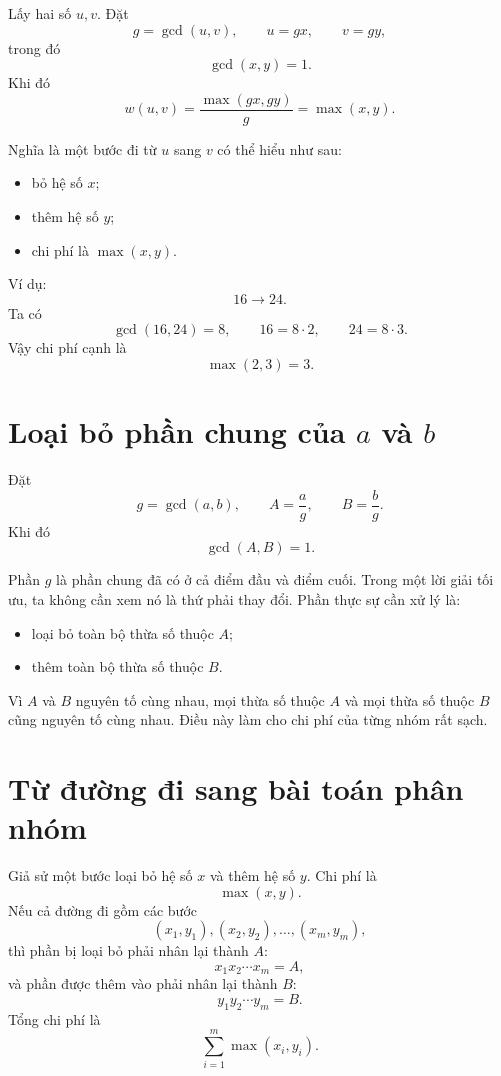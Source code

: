 \documentclass[11pt,a4paper]{article}
\begin{document}
Lấy hai số \(u,v\). Đặt
\[
  g=\gcd(u,v),\qquad u=gx,\qquad v=gy,
\]
trong đó
\[
  \gcd(x,y)=1.
\]
Khi đó
\[
  w(u,v)=\frac{\max(gx,gy)}{g}=\max(x,y).
\]

Nghĩa là một bước đi từ \(u\) sang \(v\) có thể hiểu như sau:

\begin{itemize}
  \item bỏ hệ số \(x\);
  \item thêm hệ số \(y\);
  \item chi phí là \(\max(x,y)\).
\end{itemize}

Ví dụ:
\[
16\rightarrow 24.
\]
Ta có
\[
\gcd(16,24)=8,\qquad 16=8\cdot 2,\qquad 24=8\cdot 3.
\]
Vậy chi phí cạnh là
\[
\max(2,3)=3.
\]

\section{\texorpdfstring{Loại bỏ phần chung của \(a\) và \(b\)}{Loại bỏ phần chung của a và b}}

Đặt
\[
  g=\gcd(a,b),\qquad A=\frac{a}{g},\qquad B=\frac{b}{g}.
\]
Khi đó
\[
  \gcd(A,B)=1.
\]

Phần \(g\) là phần chung đã có ở cả điểm đầu và điểm cuối. Trong một lời giải tối ưu, ta không cần xem nó là thứ phải thay đổi. Phần thực sự cần xử lý là:

\begin{itemize}
  \item loại bỏ toàn bộ thừa số thuộc \(A\);
  \item thêm toàn bộ thừa số thuộc \(B\).
\end{itemize}

Vì \(A\) và \(B\) nguyên tố cùng nhau, mọi thừa số thuộc \(A\) và mọi thừa số thuộc \(B\) cũng nguyên tố cùng nhau. Điều này làm cho chi phí của từng nhóm rất sạch.

\section{Từ đường đi sang bài toán phân nhóm}

Giả sử một bước loại bỏ hệ số \(x\) và thêm hệ số \(y\). Chi phí là
\[
  \max(x,y).
\]
Nếu cả đường đi gồm các bước
\[
  (x_1,y_1),(x_2,y_2),\ldots,(x_m,y_m),
\]
thì phần bị loại bỏ phải nhân lại thành \(A\):
\[
  x_1x_2\cdots x_m=A,
\]
và phần được thêm vào phải nhân lại thành \(B\):
\[
  y_1y_2\cdots y_m=B.
\]
Tổng chi phí là
\[
  \sum_{i=1}^{m}\max(x_i,y_i).
\]
\end{document}
